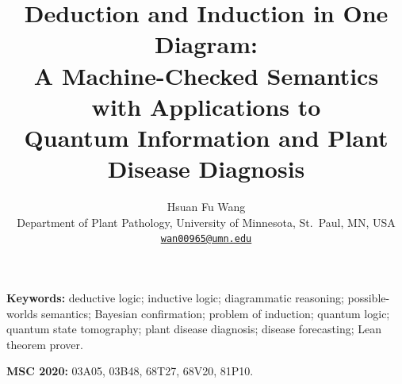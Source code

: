 \documentclass[11pt]{article}
\title{Deduction and Induction in One Diagram:\\ A Machine-Checked Semantics with Applications to\\ Quantum Information and Plant Disease Diagnosis}
\author{Hsuan Fu Wang\\[2pt]
  {\small Department of Plant Pathology, University of Minnesota, St.\ Paul, MN, USA}\\
  {\small\href{mailto:wan00965@umn.edu}{\texttt{wan00965@umn.edu}}}}
\date{}
\begin{document}
\maketitle

\medskip
\noindent\textbf{Keywords:} deductive logic; inductive logic; diagrammatic reasoning;
possible-worlds semantics; Bayesian confirmation; problem of induction; quantum logic;
quantum state tomography; plant disease diagnosis; disease forecasting; Lean theorem prover.

\smallskip
\noindent\textbf{MSC 2020:} 03A05, 03B48, 68T27, 68V20, 81P10.









\appendix



\end{document}
